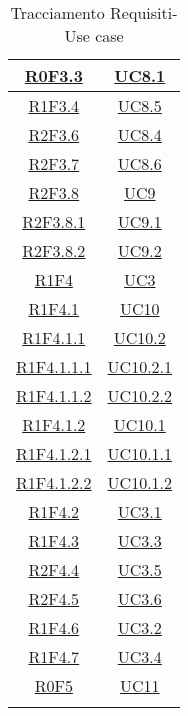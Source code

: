 \begin{longtable}{|c|c|}
\hline
\hyperlink{R0F3.3}{R0F3.3} & \hyperlink{UC8.1}{UC8.1}\\
\hline
\hyperlink{R1F3.4}{R1F3.4} & \hyperlink{UC8.5}{UC8.5}\\
\hline
\hyperlink{R2F3.6}{R2F3.6} & \hyperlink{UC8.4}{UC8.4}\\
\hline
\hyperlink{R2F3.7}{R2F3.7} & \hyperlink{UC8.6}{UC8.6}\\
\hline
\hyperlink{R2F3.8}{R2F3.8} & \hyperlink{UC9}{UC9}\\
\hline
\hyperlink{R2F3.8.1}{R2F3.8.1} & \hyperlink{UC9.1}{UC9.1}\\
\hline
\hyperlink{R2F3.8.2}{R2F3.8.2} & \hyperlink{UC9.2}{UC9.2}\\
\hline
\hyperlink{R1F4}{R1F4} & \hyperlink{UC3}{UC3}\\
\hline
\hyperlink{R1F4.1}{R1F4.1} & \hyperlink{UC10}{UC10}\\
\hline
\hyperlink{R1F4.1.1}{R1F4.1.1} & \hyperlink{UC10.2}{UC10.2}\\
\hline
\hyperlink{R1F4.1.1.1}{R1F4.1.1.1} & \hyperlink{UC10.2.1}{UC10.2.1}\\
\hline
\hyperlink{R1F4.1.1.2}{R1F4.1.1.2} & \hyperlink{UC10.2.2}{UC10.2.2}\\
\hline
\hyperlink{R1F4.1.2}{R1F4.1.2} & \hyperlink{UC10.1}{UC10.1}\\
\hline
\hyperlink{R1F4.1.2.1}{R1F4.1.2.1} & \hyperlink{UC10.1.1}{UC10.1.1}\\
\hline
\hyperlink{R1F4.1.2.2}{R1F4.1.2.2} & \hyperlink{UC10.1.2}{UC10.1.2}\\
\hline
\hyperlink{R1F4.2}{R1F4.2} & \hyperlink{UC3.1}{UC3.1}\\
\hline
\hyperlink{R1F4.3}{R1F4.3} & \hyperlink{UC3.3}{UC3.3}\\
\hline
\hyperlink{R2F4.4}{R2F4.4} & \hyperlink{UC3.5}{UC3.5}\\
\hline
\hyperlink{R2F4.5}{R2F4.5} & \hyperlink{UC3.6}{UC3.6}\\
\hline
\hyperlink{R1F4.6}{R1F4.6} & \hyperlink{UC3.2}{UC3.2}\\
\hline
\hyperlink{R1F4.7}{R1F4.7} & \hyperlink{UC3.4}{UC3.4}\\
\hline
\hyperlink{R0F5}{R0F5} & \hyperlink{UC11}{UC11}\\
\hline
\caption[Tracciamento Requisiti-Use case]{Tracciamento Requisiti-Use case}
\label{tabella:requi-usecase}
\end{longtable}
\clearpage
\normalsize
